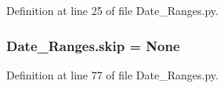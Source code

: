 Definition at line 25 of file Date\+\_\+\+Ranges.\+py.

\hypertarget{namespace_date___ranges_a2e24c9e69898dca66dbb055153bb007c}{}
\subsubsection[{skip}]{\setlength{\rightskip}{0pt plus 5cm}Date\+\_\+\+Ranges.\+skip = None}\label{namespace_date___ranges_a2e24c9e69898dca66dbb055153bb007c}


Definition at line 77 of file Date\+\_\+\+Ranges.\+py.

